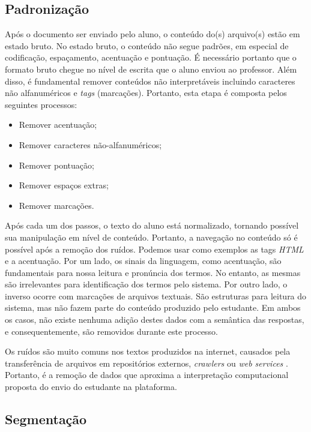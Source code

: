\subsection{Padronização}
\label{subsec-padronizacao}


Após o documento ser enviado pelo aluno, o conteúdo do(s) arquivo(s) estão em estado bruto. No estado bruto, o conteúdo não segue padrões, em especial de codificação, espaçamento, acentuação e pontuação. É necessário portanto que o formato bruto chegue no nível de escrita que o aluno enviou ao professor. Além disso, é fundamental remover conteúdos não interpretáveis incluindo caracteres não alfanuméricos e \textit{tags} (marcações). Portanto, esta etapa é composta pelos seguintes processos:

\begin{itemize}
	\item Remover acentuação;
	\item Remover caracteres não-alfanuméricos;
	\item Remover pontuação;
	\item Remover espaços extras;
	\item Remover marcações.
\end{itemize}

Após cada um dos passos, o texto do aluno está normalizado, tornando possível sua manipulação em nível de conteúdo. Portanto, a navegação no conteúdo só é possível após a remoção dos ruídos. Podemos usar como exemplos as tags \textit{HTML} e a acentuação. Por um lado, os sinais da linguagem, como acentuação, são fundamentais para nossa leitura e pronúncia dos termos. No entanto, as mesmas são irrelevantes para identificação dos termos pelo sistema. Por outro lado, o inverso ocorre com marcações de arquivos textuais. São estruturas para leitura do sistema, mas não fazem parte do conteúdo produzido pelo estudante. Em ambos os casos, não existe nenhuma adição destes dados com a semântica das respostas, e consequentemente, são removidos durante este processo. 

Os ruídos são muito comuns nos textos produzidos na internet, causados pela transferência de arquivos em repositórios externos, \textit{crawlers} ou \textit{web services} \cite{han2011}. Portanto, é a remoção de dados que aproxima a interpretação computacional proposta do envio do estudante na plataforma.

\subsection{Segmentação}
\label{subsec-segmentacao}

